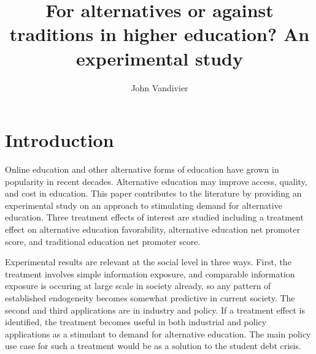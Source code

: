 \documentclass[review]{elsarticle}
\begin{document}
\begin{frontmatter}

\title{
    For alternatives or against traditions in higher education? An experimental study %
}

\author[mymainaddress]{John Vandivier}
\address[mymainaddress]{4400 University Dr, Fairfax, VA 22030}


\begin{abstract}
\end{abstract}

\begin{keyword}
\MSC[2010] %
\end{keyword}

\end{frontmatter}

\pagebreak
\linenumbers

    \section{Introduction}
    
    Online education and other alternative forms of education have grown in popularity in recent decades.
    Alternative education may improve access, quality, and cost in education.
    This paper contributes to the literature by providing an experimental study on an approach to stimulating demand
    for alternative education.
    Three treatment effects of interest are studied including a treatment effect on alternative education favorability,
    alternative education net promoter score,
    and traditional education net promoter score.
    
    Experimental results are relevant at the social level in three ways. First, the treatment involves simple information exposure,
    and comparable information exposure is occuring at large scale in society already, so any pattern of established endogeneity
    becomes somewhat predictive in current society. The second and third applications are in industry and policy. If a treatment effect is
    identified, the treatment becomes useful in both industrial and policy applications as a stimulant to demand for alternative education.
    The main policy use case for such a treatment would be as a solution to the student debt crisis.
\end{document}
